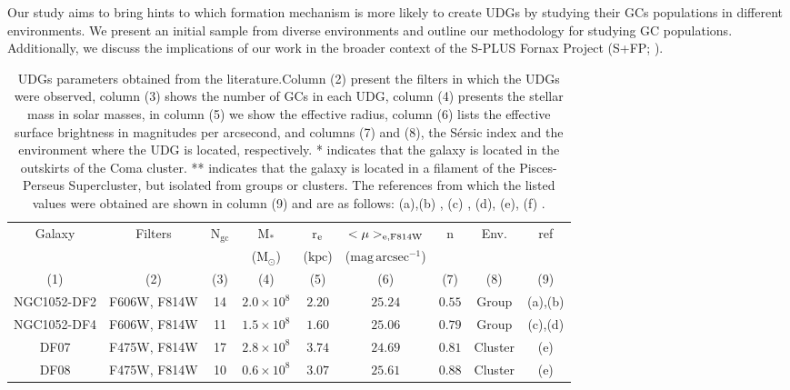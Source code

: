 \documentclass[baaa]{baaa}
\begin{document}
Our study aims to bring hints to which formation mechanism is more likely to create UDGs by studying their GCs populations in different environments. We present an initial sample from diverse environments and outline our methodology for studying GC populations. Additionally, we discuss the implications of our work in the broader context of the S-PLUS Fornax Project (S+FP; \citealp{SC2024}).



\begin{table*}[]
    \caption{UDGs parameters obtained from the literature.Column (2) present the filters in which the UDGs were observed, column (3) shows the number of GCs in each UDG, column (4) presents the stellar mass in solar masses, in column (5) we show the effective radius, column (6) lists the effective surface brightness in magnitudes per arcsecond, and columns (7) and (8), the Sérsic index and the environment where the UDG is located, respectively. * indicates that the galaxy is located in the outskirts of the Coma cluster. ** indicates that the galaxy is located in a filament of the Pisces-Perseus Supercluster, but isolated from groups or clusters. The references from which the listed values were obtained are shown in column (9) and are as follows: 
    (a)\cite{Montes_2021_DF2},(b) \cite{vanDokkum2018_df2}, (c) \cite{Montes_2021_DF4}, (d)\cite{vanDokkum2019_df4}, (e)\cite{Saifollahi2022}, (f) \cite{Janssens2022}.}
    \label{Sample}
    \centering
    \begin{tabular}{ccccccccc}
        \hline \hline
         Galaxy & Filters & \textrm{N}$_{\mathrm{gc}}$&M$_{*}$       & r$_{\rm e}$&  $<\mu>_{\rm e,F814W}$    &n &Env. &ref \\
                &         &         & ($\mathrm{M}_{\odot}$)  & ($\mathrm{kpc}$)  & ($\mathrm{mag\, arcsec}^{-1}$)   & & &  \\
            (1)    &  (2)       &    (3)     &        (4)        &   (5)     &           (6)            & (7)  &   (8)   &  (9) \\
         \hline
         NGC1052-DF2& F606W, F814W& 14 &$2.0\times 10^{8} $  &$2.20 $ &$25.24 $ & $0.55$& Group & (a),(b) \\
         NGC1052-DF4& F606W, F814W& 11 &$1.5\times 10^{8} $  &$1.60 $ &$25.06 $ & $0.79$& Group & (c),(d) \\
         DF07       &F475W, F814W & 17 &$2.8\times 10^{8} $  &$3.74 $ &$24.69 $ & $0.81$&Cluster & (e) \\
         DF08       &F475W, F814W & 10 &$0.6\times 10^{8} $  &$3.07 $ &$25.61 $ & $0.88$&Cluster & (e) \\

\end{tabular}
\end{table*}
\end{document}
